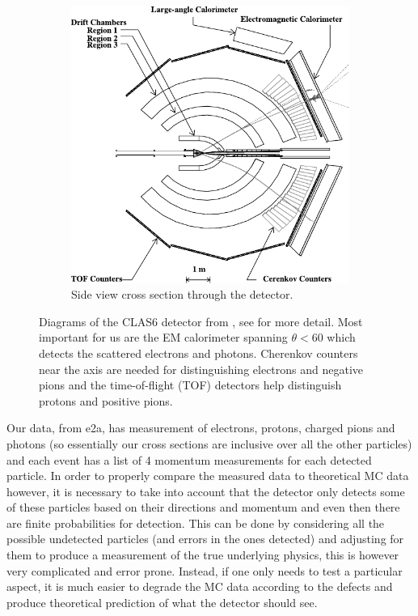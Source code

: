 \documentclass[a4paper,12pt]{article}
\begin{document}
\begin{figure}[H]
\begin{subfigure}[b]{0.5\textwidth}
        \includegraphics[width=\textwidth]{figures/CLAS_side.pdf}
        \caption{Side view cross section through the detector.}
    \end{subfigure}
    \caption{\label{fig:CLAS}
        Diagrams of the CLAS6 detector from \cite{meckingCEBAFLargeAcceptance2003}, see for more detail.
        Most important for us are the EM calorimeter spanning $\theta < 60$ which detects the scattered electrons and photons.
        Cherenkov counters near the axis are needed for distinguishing electrons and negative pions and the time-of-flight (TOF) detectors help distinguish protons and positive pions.
    }
\end{figure}

Our data, from e2a, has measurement of electrons, protons, charged pions and photons (so essentially our cross sections are inclusive over all the other particles) and each event has a list of 4 momentum measurements for each detected particle.
In order to properly compare the measured data to theoretical MC data however, it is necessary to take into account that the detector only detects some of these particles based on their directions and momentum and even then there are finite probabilities for detection.
This can be done by considering all the possible undetected particles (and errors in the ones detected) and adjusting for them to produce a measurement of the true underlying physics, this is however very complicated and error prone.
Instead, if one only needs to test a particular aspect, it is much easier to degrade the MC data according to the defects and produce theoretical prediction of what the detector should see.
\end{document}

